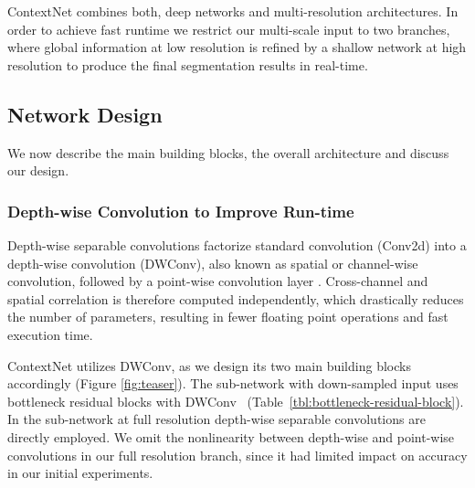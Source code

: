 \documentclass[runningheads]{llncs}
\begin{document}
ContextNet combines both, deep networks and multi-resolution architectures. In order to achieve fast runtime we restrict our multi-scale input to two branches, where global information at low resolution is refined by a shallow network at high resolution to produce the final segmentation results in real-time.

\subsection{Network Design}\label{ssec:net-architecture}
We now describe the main building blocks, the overall architecture and discuss our design.

\subsubsection{Depth-wise Convolution to Improve Run-time}
\begin{table}[t]
\begin{center}
\end{center}
\caption{\textit{Bottleneck residual block} transferring the input from  to  channels with  height,  width, expansion factor , convolution type kernel-size/stride  and non-linear function .}\label{tbl:bottleneck-residual-block}
\end{table}
Depth-wise separable convolutions factorize standard convolution (Conv2d) into a depth-wise convolution (DWConv), also known as spatial or channel-wise convolution, followed by a  point-wise convolution layer \cite{howard2017}. Cross-channel and spatial correlation is therefore computed independently, which drastically reduces the number of parameters, resulting in fewer floating point operations and fast execution time.

ContextNet utilizes DWConv, as we design its two main building blocks accordingly (Figure \ref{fig:teaser}). The sub-network with down-sampled input uses bottleneck residual blocks with DWConv~\cite{sandler2018} (Table~\ref{tbl:bottleneck-residual-block}). In the sub-network at full resolution depth-wise separable convolutions are directly employed. We omit the nonlinearity between depth-wise and point-wise convolutions in our full resolution branch, since it had limited impact on accuracy in our initial experiments.
\end{document}
